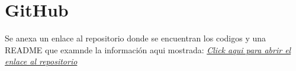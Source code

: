 \appendix
\chapter{GitHub}
Se anexa un enlace al repositorio donde se encuentran los codigos y una README que examnde la información aqui mostrada: \href{https://github.com/CARBAJE/Genetic-Algorithm--with-real-valued-chromosomes-}{\textit{Click aqui para abrir el enlace al repositorio}}

